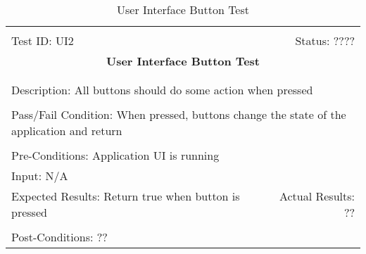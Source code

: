 \documentclass[11pt]{article}
\begin{document}
\begin{center}
\begin{table}[H]
\begin{tabular}{|l r|}\hline&\\[-2mm]
	Test ID: UI2	&Status: ???? \\[-3mm]
	\multicolumn{2}{|c|}{\textbf{\large{User Interface Button Test}}}\\&\\\hline&\\[-3mm]
	\multicolumn{2}{|p{\textwidth}|}{Description: All buttons should do some action when pressed}\\[1mm]\hline&\\[-3mm]
	\multicolumn{2}{|p{\textwidth}|}{Pass/Fail Condition: When pressed, buttons change the state of the application and return }\\[1mm]\hline&\\[-3mm]
	\multicolumn{2}{|p{\textwidth}|}{Pre-Conditions: Application UI is running}\\[4mm]
	\multicolumn{2}{|p{\textwidth}|}{Input: N/A}\\[2mm]\hline
	\multicolumn{1}{|p{0.49\textwidth}}{Expected Results: Return true when button is pressed}	&\multicolumn{1}{|p{0.45\textwidth}|}{Actual Results: ??}\\\hline&\\[-3mm]
	\multicolumn{2}{|p{\textwidth}|}{Post-Conditions: ??}\\\hline
\end{tabular}
\caption{User Interface Button Test}
\end{table}
\end{center}
\end{document}
